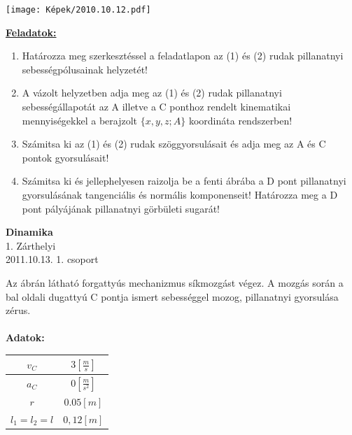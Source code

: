 \documentclass[11pt,a4paper]{article}
\begin{document}
\begin{center}
    \texttt{[image: Képek/2010.10.12.pdf]}
\end{center}

\vspace{2em}
\underline{\textbf{Feladatok:}}
\begin{enumerate}
    \item Határozza meg szerkesztéssel a feladatlapon az (1) és (2) rudak pillanatnyi
    sebességpólusainak helyzetét!
    \item A vázolt helyzetben adja meg az (1) és (2) rudak pillanatnyi sebességállapotát az A illetve a C ponthoz rendelt kinematikai mennyiségekkel a berajzolt \(\{x,y,z; A\}\) koordináta rendszerben!
    \item Számitsa ki az (1) és (2) rudak szöggyorsulásait és adja meg az A és C pontok
    gyorsulásait!
    \item Számitsa ki és jellephelyesen raizolja be a fenti ábrába a D pont pillanatnyi gyorsulásának tangenciális és normális komponenseit! Határozza meg a D pont pályájának pillanatnyi görbületi sugarát!
\end{enumerate}
\newpage

\begin{center}
    \textbf{\LARGE{Dinamika}}\\
    1. Zárthelyi\\
    2011.10.13. 1. csoport
\end{center}
Az ábrán látható forgattyús mechanizmus síkmozgást végez. A mozgás során a bal oldali dugattyú
C pontja ismert sebességgel mozog, pillanatnyi gyorsulása zérus.\\\\
\textbf{Adatok:}\\
\begin{tabular}{| c | c |}
    \hline
    $v_C $&$ 3 \left[\frac{m}{s}\right]$\\
    \hline
    $a_C $&$ 0 \left[\frac{m}{s^2}\right]$\\
    \hline
    $r $&$ 0.05 [m]$\\
    \hline
    $l_1 = l_2=l $&$ 0,12 [m]$\\
    \hline
\end{tabular}
\end{document}
